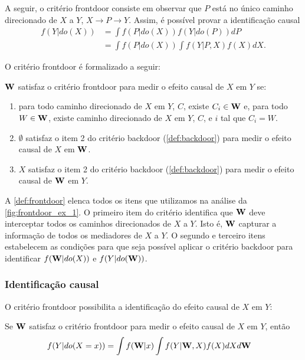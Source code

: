 A seguir, o critério frontdoor consiste 
em observar que $P$ está
no único caminho direcionado de $X$ a $Y$,
$X \rightarrow P \rightarrow Y$. Assim,
é possível provar a identificação causal
\begin{align*}
 f(Y|do(X))
 &= \int f(P|do(X))f(Y|do(P))dP \\
 &= \int f(P|do(X)) \int f(Y|P,X)f(X)dX.
\end{align*}

O critério frontdoor é formalizado a seguir:

\begin{definition}
 \label{def:frontdoor}
 ${\mathbf{W}}$ satisfaz o critério frontdoor para
 medir o efeito causal de $X$ em $Y$ se:
 \begin{enumerate}
  \item para todo caminho direcionado de $X$ em $Y$, $C$,
  existe $C_i \in {\mathbf{W}}$ e, para todo $W \in {\mathbf{W}}$,
  existe caminho direcionado de $X$ em $Y$, $C$,
  e $i$ tal que $C_i = W$.
  \item $\emptyset$ satisfaz
  o item 2 do critério backdoor (\cref{def:backdoor}) para
  medir o efeito causal de $X$ em ${\mathbf{W}}$.
  \item $X$ satisfaz
  o item 2 do critério backdoor (\cref{def:backdoor}) para
  medir o efeito causal de ${\mathbf{W}}$ em $Y$.
 \end{enumerate}
\end{definition}

A \cref{def:frontdoor} elenca todos os itens que
utilizamos na análise da \cref{fig:frontdoor_ex_1}.
O primeiro item do critério identifica que 
${\mathbf{W}}$ deve interceptar todos os caminhos direcionados
de $X$ a $Y$. Isto é, ${\mathbf{W}}$ capturar 
a informação de todos os mediadores de $X$ a $Y$.
O segundo e terceiro itens estabelecem as condições para que
seja possível aplicar o critério backdoor para 
identificar $f({\mathbf{W}}|do(X))$ e $f(Y|do({\mathbf{W}}))$.

\subsubsection{Identificação causal}

O critério frontdoor possibilita
a identificação do efeito causal de $X$ em $Y$:

\begin{theorem}
 \label{thm:frontdoor}
  Se ${\mathbf{W}}$ satisfaz o critério frontdoor para
  medir o efeito causal de $X$ em $Y$, então
  \begin{align*}
   f(Y|do(X=x))
   &= \int f({\mathbf{W}}|x) \int f(Y|{\mathbf{W}},X)f(X) dX d{\mathbf{W}}
  \end{align*}
\end{theorem}

